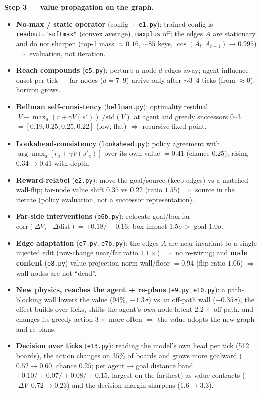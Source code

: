 \documentclass[11pt]{article}
\begin{document}
\textbf{Step 3 --- value propagation on the graph.}
\begin{itemize}[leftmargin=1.4em,itemsep=1pt,topsep=2pt]
\item \textbf{No-max / static operator} (config + \texttt{e1.py}): trained config is
\texttt{readout="softmax"} (convex average), \texttt{maxplus} off; the edges $A$ are stationary and do not
sharpen (top-1 mass ${\approx}0.16$, ${\sim}85$ keys, $\cos(A_t,A_{t-1})\!\to\!0.995$) $\Rightarrow$ evaluation, not iteration.
\item \textbf{Reach compounds} (\texttt{e5.py}): perturb a node $d$ edges away; agent-influence
onset per tick --- far nodes ($d{=}7$--$9$) arrive only after ${\sim}3$--$4$ ticks (from ${\approx}0$); horizon grows.
\item \textbf{Bellman self-consistency} (\texttt{bellman.py}): optimality residual
$|V-\max_a(r{+}\gamma V(s'))|/\mathrm{std}(V)$ at agent and greedy successors $0$--$3$ $=[0.19,0.25,0.25,0.22]$
(low, flat) $\Rightarrow$ recursive fixed point.
\item \textbf{Lookahead-consistency} (\texttt{lookahead.py}): policy agreement with
$\arg\max_a[r_a{+}\gamma V(s'_a)]$ over its own value $=0.41$ (chance $0.25$), rising $0.34\!\to\!0.41$ with depth.
\item \textbf{Reward-relabel} (\texttt{e2.py}): move the goal/source (keep edges) vs a matched
wall-flip; far-node value shift $0.35$ vs $0.22$ (ratio $1.55$) $\Rightarrow$ source in the iterate
(policy evaluation, not a successor representation).
\item \textbf{Far-side interventions} (\texttt{e6b.py}): relocate goal/box far ---
$\mathrm{corr}(\Delta V,-\Delta\text{dist})=+0.18/{+}0.16$; box impact $1.5\sigma>$ goal $1.0\sigma$.
\item \textbf{Edge adaptation} (\texttt{e7.py}, \texttt{e7b.py}): the edges $A$ are
near-invariant to a single injected edit (row-change near/far ratio $1.1\times$) $\Rightarrow$ no re-wiring;
and \textbf{node content} (\texttt{e8.py}) value-projection norm wall/floor $=0.94$ (flip ratio
$1.06$) $\Rightarrow$ wall nodes are not ``dead''.
\item \textbf{New physics, reaches the agent + re-plans} (\texttt{e9.py},
\texttt{e10.py}): a path-blocking wall lowers the value ($94\%$, $-1.3\sigma$) vs an off-path wall
($-0.35\sigma$), the effect builds over ticks, shifts the agent's \emph{own} node latent $2.2\times$ off-path,
and changes its greedy action $3\times$ more often $\Rightarrow$ the value adopts the new graph and re-plans.
\item \textbf{Decision over ticks} (\texttt{e13.py}): reading the model's own head per tick (512
boards), the action changes on $35\%$ of boards and grows more goalward ($0.52\!\to\!0.60$, chance $0.25$;
per agent$\to$goal distance band $+0.10/{+}0.07/{+}0.08/{+}0.15$, largest on the farthest) as value contracts
($|\Delta V|\,0.72\!\to\!0.23$) and the decision margin sharpens ($1.6\!\to\!3.3$).
\end{itemize}
\end{document}

